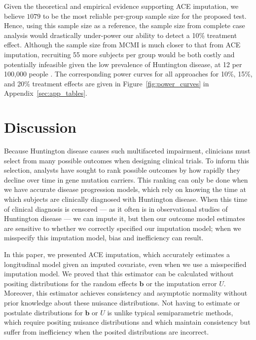 \documentclass[12pt]{article}
\def\bb{{\boldsymbol b}}
\begin{document}
Given the theoretical and empirical evidence supporting ACE imputation, we believe $1079$ to be the most reliable per-group sample size for the proposed test. Hence, using this sample size as a reference, the sample size from complete case analysis would drastically under-power our ability to detect a 10\% treatment effect. Although the sample size from MCMI is much closer to that from ACE imputation, recruiting 55 more subjects per group would be both costly and potentially infeasible given the low prevalence of Huntington disease, at 12 per 100,000 people \citep{wexler2016george}. The corresponding power curves for all approaches for 10\%, 15\%, and 20\% treatment effects are given in Figure~\ref{fig:power_curves} in Appendix~\ref{sec:app_tables}. 

\section{Discussion}
\label{sec:discussion}

Because Huntington disease causes such multifaceted impairment, clinicians must select from many possible outcomes when designing clinical trials. To inform this selection, analysts have sought to rank possible outcomes by how rapidly they decline over time in gene mutation carriers. This ranking can only be done when we have accurate disease progression models, which rely on knowing the time at which subjects are clinically diagnosed with Huntington disease. When this time of clinical diagnosis is censored --- as it often is in observational studies of Huntington disease --- we can impute it, but then our outcome model estimates are sensitive to whether we correctly specified our imputation model; when we misspecify this imputation model, bias and inefficiency can result.

In this paper, we presented ACE imputation, which accurately estimates a longitudinal model given an imputed covariate, even when we use a misspecified imputation model. %
We proved that this estimator can be calculated without positing distributions for the random effects $\bb$ or the imputation error $U$. Moreover, this estimator achieves consistency and asymptotic normality without prior knowledge about these nuisance distributions. Not having to estimate or postulate distributions for $\bb$ or $U$ is unlike typical semiparametric methods, which require positing nuisance distributions and which maintain consistency but suffer from inefficiency when the posited distributions are incorrect. 
\end{document}
